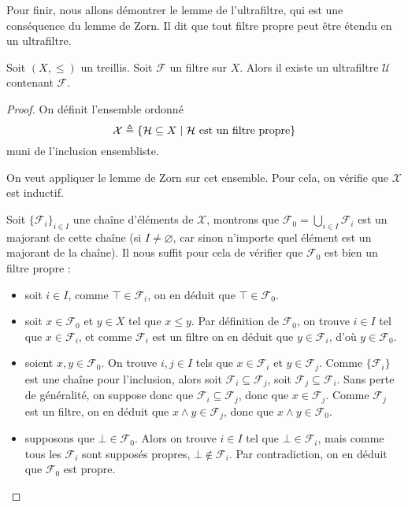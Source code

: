 Pour finir, nous allons démontrer le lemme de l'ultrafiltre, qui est une
conséquence du lemme de Zorn. Il dit que tout filtre propre peut être étendu en
un ultrafiltre.

\begin{theorem}\label{thm.ultrafilter.lemma}
  Soit $(X,\leq)$ un treillis. Soit $\mathcal F$ un filtre sur $X$. Alors il
  existe un ultrafiltre $\mathcal U$ contenant $\mathcal F$.
\end{theorem}

\begin{proof}
  On définit l'ensemble ordonné
  \[\mathcal X \triangleq \{\mathcal H \subseteq X\mid \mathcal H
  \text{ est un filtre propre}\}\]
  muni de l'inclusion ensembliste.

  On veut appliquer le lemme de Zorn sur cet ensemble. Pour cela, on vérifie
  que $\mathcal X$ est inductif.

  Soit $\{\mathcal F_i\}_{i\in I}$ une chaîne d'éléments de $\mathcal X$,
  montrons que $\mathcal F_0 = \displaystyle\bigcup_{i\in I} \mathcal F_i$ est un
  majorant de cette chaîne (si $I \neq \varnothing$, car sinon n'importe quel
  élément est un majorant de la chaîne). Il nous suffit pour cela de vérifier
  que $\mathcal F_0$ est bien un filtre propre :
  \begin{itemize}
  \item soit $i\in I$, comme $\top \in \mathcal F_i$, on en déduit que
    $\top \in \mathcal F_0$.
  \item soit $x\in \mathcal F_0$ et $y\in X$ tel que $x\leq y$. Par définition
    de $\mathcal F_0$, on trouve $i\in I$ tel que $x\in \mathcal F_i$, et comme
    $\mathcal F_i$ est un filtre on en déduit que $y\in \mathcal F_i$, d'où
    $y\in\mathcal F_0$.
  \item soient $x,y\in \mathcal F_0$. On trouve $i,j\in I$ tels que
    $x\in \mathcal F_i$ et $y\in \mathcal F_j$. Comme $\{\mathcal F_i\}$ est une
    chaîne pour l'inclusion, alors soit $\mathcal F_i \subseteq \mathcal F_j$,
    soit $\mathcal F_j\subseteq \mathcal F_i$. Sans perte de généralité, on
    suppose donc que $\mathcal F_i\subseteq \mathcal F_j$, donc que
    $x\in \mathcal F_j$. Comme $\mathcal F_j$ est un filtre, on en déduit que
    $x\land y \in \mathcal F_j$, donc que $x\land y \in \mathcal F_0$.
  \item supposons que $\bot\in \mathcal F_0$. Alors on trouve $i\in I$ tel que
    $\bot\in \mathcal F_i$, mais comme tous les $\mathcal F_i$ sont supposés
    propres, $\bot\notin\mathcal F_i$. Par contradiction, on en déduit que
    $\mathcal F_0$ est propre.
  \end{itemize}


\end{proof}
